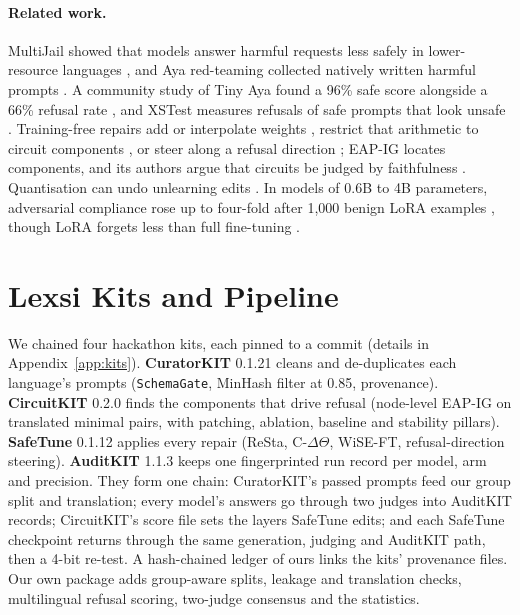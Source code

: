\documentclass[11pt]{article}
\begin{document}
\paragraph{Related work.} MultiJail showed that models answer harmful requests less safely in lower-resource
languages \citep{deng2024multijail}, and Aya red-teaming collected natively written harmful prompts
\citep{aakanksha2024prism}. A community study of Tiny Aya found a 96\% safe score alongside a 66\% refusal rate
\citep{cohere2026mixfinetunebreak}, and XSTest measures refusals of safe prompts that look unsafe
\citep{rottger2024xstest}. Training-free repairs add or interpolate weights
\citep{ilharco2023taskarithmetic,bhardwaj2024resta,wortsman2022wiseft}, restrict that arithmetic to circuit
components \citep{kasliwal2026ctheta}, or steer along a refusal direction \citep{arditi2024refusal}; EAP-IG locates
components, and its authors argue that circuits be judged by faithfulness \citep{hanna2024faith}. Quantisation can
undo unlearning edits \citep{zhang2025unlearningquant}. In models of 0.6B to 4B parameters, adversarial compliance
rose up to four-fold after 1,000 benign LoRA examples \citep{hawkins2026heterogeneous}, though LoRA forgets less than
full fine-tuning \citep{biderman2024loraforgets}.

\section{Lexsi Kits and Pipeline}\label{sec:kits}

We chained four hackathon kits, each pinned to a commit (details in Appendix~\ref{app:kits}). \textbf{CuratorKIT}
0.1.21 \citep{bhattacharjee2026curatorkit} cleans and de-duplicates each language's prompts (\texttt{SchemaGate}, MinHash filter at 0.85, provenance). \textbf{CircuitKIT}
0.2.0 \citep{seth2026circuitkit} finds the components that drive refusal (node-level EAP-IG on translated minimal
pairs, with patching, ablation, baseline and stability pillars). \textbf{SafeTune} 0.1.12 \citep{seth2026safetune}
applies every repair (ReSta, C-$\Delta\Theta$, WiSE-FT, refusal-direction steering). \textbf{AuditKIT} 1.1.3
\citep{arora2026auditkit} keeps one fingerprinted run record per model, arm and precision. They form one chain:
CuratorKIT's passed prompts feed our group split and translation; every model's answers go through two judges into
AuditKIT records; CircuitKIT's score file sets the layers SafeTune edits; and each SafeTune checkpoint returns through
the same generation, judging and AuditKIT path, then a 4-bit re-test. A hash-chained ledger of ours links the kits'
provenance files. Our own package adds group-aware splits, leakage and translation checks, multilingual refusal scoring,
two-judge consensus and the statistics.
\end{document}
